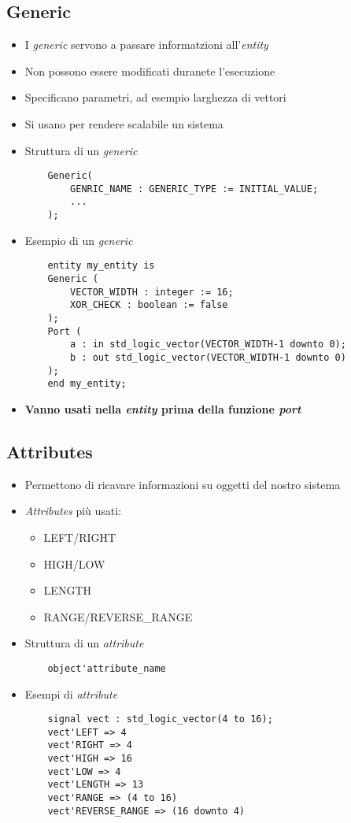 \documentclass{article}
\begin{document}
\subsection{Generic}
\begin{itemize}
	\item I \textit{generic} servono a passare informatzioni all'\textit{entity}
	\item Non possono essere modificati duranete l'esecuzione
	\item Specificano parametri, ad esempio larghezza di vettori
	\item Si usano per rendere scalabile un sistema
	\item Struttura di un \textit{generic}
	      \begin{verbatim}
    Generic(
        GENRIC_NAME : GENERIC_TYPE := INITIAL_VALUE;
        ...
    );
	      \end{verbatim}
	\item Esempio di un \textit{generic}
	      \begin{verbatim}
    entity my_entity is
    Generic (
        VECTOR_WIDTH : integer := 16;
        XOR_CHECK : boolean := false
    );
    Port (
        a : in std_logic_vector(VECTOR_WIDTH-1 downto 0);
        b : out std_logic_vector(VECTOR_WIDTH-1 downto 0)
    );
    end my_entity;
	      \end{verbatim}
	\item \textbf{Vanno usati nella \textit{entity} prima della funzione \textit{port}}
\end{itemize}

\subsection{Attributes}
\begin{itemize}
	\item Permettono di ricavare informazioni su oggetti del nostro sistema
	\item \textit{Attributes} più usati:
	      \begin{itemize}
	      	\item LEFT/RIGHT
	      	\item HIGH/LOW
	      	\item LENGTH
	      	\item RANGE/REVERSE\_RANGE
	      \end{itemize}
	\item Struttura di un \textit{attribute}
	      \begin{verbatim}
    object'attribute_name
	      \end{verbatim}
	\item Esempi di \textit{attribute}
	      \begin{verbatim}
    signal vect : std_logic_vector(4 to 16);
    vect'LEFT => 4
    vect'RIGHT => 4
    vect'HIGH => 16
    vect'LOW => 4
    vect'LENGTH => 13
    vect'RANGE => (4 to 16)
    vect'REVERSE_RANGE => (16 downto 4)
	      \end{verbatim}
\end{itemize}
\end{document}
